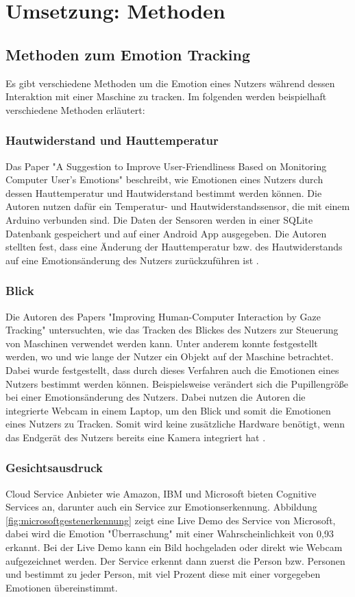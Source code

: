 \section{Umsetzung: Methoden}
\subsection{Methoden zum Emotion Tracking}\label{MethodenEmotionTracking}
Es gibt verschiedene Methoden um die Emotion eines Nutzers während dessen Interaktion mit einer Maschine zu tracken. Im folgenden werden beispielhaft verschiedene Methoden erläutert:

\subsubsection{Hautwiderstand und Hauttemperatur}
Das Paper "A Suggestion to Improve User-Friendliness Based
on Monitoring Computer User’s Emotions" beschreibt, wie Emotionen eines Nutzers durch dessen Hauttemperatur und Hautwiderstand bestimmt werden können. Die Autoren nutzen dafür ein Temperatur- und Hautwiderstandssensor, die mit einem Arduino verbunden sind. Die Daten der Sensoren werden in einer SQLite Datenbank gespeichert und auf einer Android App ausgegeben. Die Autoren stellten fest, dass eine Änderung der Hauttemperatur bzw. des Hautwiderstands  auf eine Emotionsänderung des Nutzers zurückzuführen ist \cite{EmotionTrackingGSR}.

\subsubsection{Blick}
Die Autoren des Papers "Improving Human-Computer Interaction
by Gaze Tracking" untersuchten, wie das Tracken des Blickes des Nutzers zur Steuerung von Maschinen verwendet werden kann. Unter anderem konnte festgestellt werden, wo und wie lange der Nutzer ein Objekt auf der Maschine betrachtet. Dabei wurde festgestellt, dass durch dieses Verfahren auch die Emotionen eines Nutzers bestimmt werden können. Beispielsweise verändert sich die Pupillengröße bei einer Emotionsänderung des Nutzers. Dabei nutzen die Autoren die integrierte Webcam in einem Laptop, um den Blick und somit die Emotionen eines Nutzers zu Tracken. Somit wird keine zusätzliche Hardware benötigt, wenn das Endgerät des Nutzers bereits eine Kamera integriert hat \cite{EmotionTrackingGaze}.

\subsubsection{Gesichtsausdruck}
Cloud Service Anbieter wie Amazon, IBM und Microsoft bieten Cognitive Services an, darunter auch ein Service zur Emotionserkennung. Abbildung \ref{fig:microsoftgestenerkennung} zeigt eine Live Demo des Service von Microsoft, dabei wird die Emotion "Überraschung" mit einer Wahrscheinlichkeit von 0,93 erkannt. Bei der Live Demo kann ein Bild hochgeladen oder direkt wie Webcam aufgezeichnet werden. Der Service erkennt dann zuerst die Person bzw. Personen und bestimmt zu jeder Person, mit viel Prozent diese mit einer vorgegeben Emotionen übereinstimmt.

